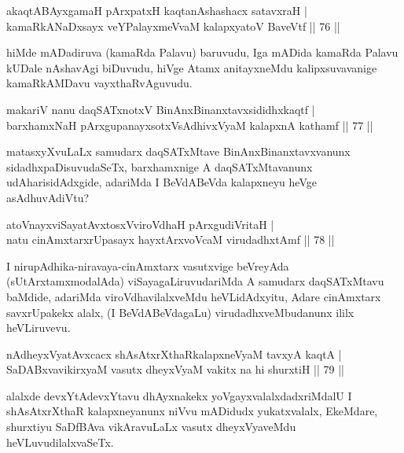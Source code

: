 \begin{shl}
akaqtABAyxgamaH pArxpatxH kaqtanAshashacx satavxraH  | \\
kamaRkANaDxsayx veYPalayxmeVvaM kalapxyatoV BaveVtf \hfill||  76 ||  
\end{shl}

\begin{artha}
hiMde mADadiruva (kamaRda Palavu) baruvudu, Iga mADida kamaRda Palavu kUDale nAshavAgi biDuvudu, hiVge Atamx anitayxneMdu kalipxsuvavanige kamaRkAMDavu vayxthaRvAguvudu.
\end{artha}


\begin{shl}
makariV nanu daqSATxnotxV BinAnxBinanxtavxsididhxkaqtf  | \\
barxhamxNaH pArxgupanayxsotxV\s sAdhivxVyaM kalapxnA kathamf \hfill||  77 ||  
\end{shl}

\begin{artha}
matasxyXvuLaLx samudarx daqSATxMtave BinAnxBinanxtavxvanunx sidadhxpaDisuvudaSeTx, barxhamxnige A daqSATxMtavanunx udAharisidAdxgide, adariMda I BeVdABeVda kalapxneyu heVge asAdhuvAdiVtu?
\end{artha}


\begin{shl}
atoV\s nayxviSayatAvxtosxV\s viroVdhaH pArxgudiVritaH  | \\
natu cinAmxtarxrUpasayx hayxtArxvoVcaM virudadhxtAmf \hfill||  78 ||  
\end{shl}

\begin{artha}
I nirupAdhika-niravaya-cinAmxtarx vasutxvige beVreyAda (sUtArxtamx\break modalAda) viSayagaLiruvudariMda A samudarx daqSATxMtavu baMdide, adariMda viroVdhavilalxveMdu heVLidAdxyitu, Adare cinAmxtarx savxrUpakekx alalx, (I BeVdABeVdagaLu) virudadhxveMbudanunx ililx heVLiruvevu.
\end{artha}

\begin{shl}
nAdheyxVyatAvxcacx shAsAtxrXthaRkalapxneVyaM tavxyA kaqtA  | \\
SaDABxvavikirxyaM vasutx dheyxVyaM vakitx na hi shurxtiH \hfill||  79 ||  
\end{shl}

\begin{artha}
alalxde devxYtAdevxYtavu dhAyxnakekx yoVgayxvalalxdadxriMdalU I shAsAtxrXthaR kalapxneyanunx niVvu mADidudx yukatxvalalx, EkeMdare, shurxtiyu SaDfBAva vikAravuLaLx vasutx dheyxVyaveMdu heVLuvudilalxvaSeTx.
\end{artha}

